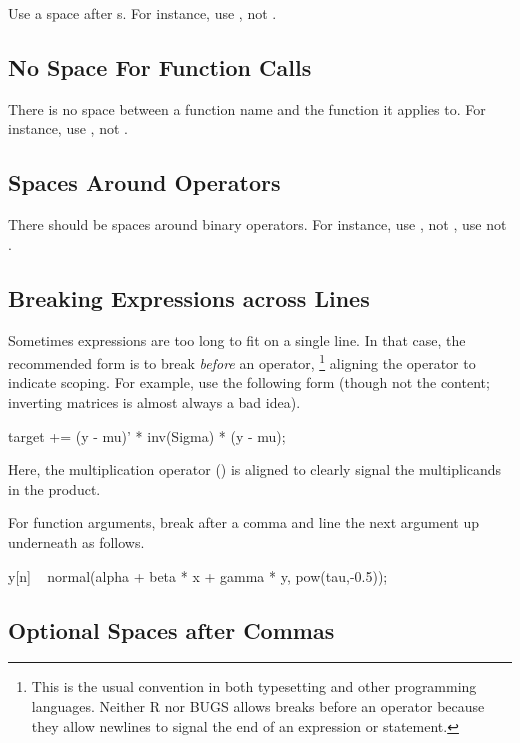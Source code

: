 Use a space after s.  For instance, use , not
.

\subsection{No Space For Function Calls}

There is no space between a function name and the function it applies
to.  For instance, use , not .

\subsection{Spaces Around Operators}

There should be spaces around binary operators.  For instance, use
, not , use  not
.

\subsection{Breaking Expressions across Lines}

Sometimes expressions are too long to fit on a single line.  In that
case, the recommended form is to break \emph{before} an operator,%
%
\footnote{This is the usual convention in both typesetting and other
  programming languages. Neither R nor BUGS allows breaks before an
  operator because they allow newlines to signal the end of an
  expression or statement.}
%
aligning the operator to indicate scoping.  For example, use the
following form (though not the content; inverting matrices is almost
always a bad idea).
%
\begin{stancode}
target += (y - mu)' * inv(Sigma) * (y - mu);
\end{stancode}
%
Here, the multiplication operator (\code{*}) is aligned to clearly
signal the multiplicands in the product.  

For function arguments, break after a comma and line the next
argument up underneath as follows.
%
\begin{stancode}
y[n] ~ normal(alpha + beta * x + gamma * y,
              pow(tau,-0.5));
\end{stancode}
%

\subsection{Optional Spaces after Commas}

